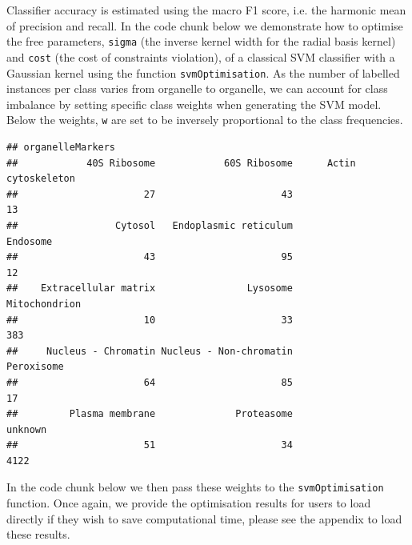 Classifier accuracy is estimated using the macro F1 score, i.e. the
harmonic mean of precision and recall. In the code chunk below we
demonstrate how to optimise the free parameters, \texttt{sigma} (the
inverse kernel width for the radial basis kernel) and \texttt{cost}
(the cost of constraints violation), of a classical SVM classifier
with a Gaussian kernel using the function \texttt{svmOptimisation}. As
the number of labelled instances per class varies from organelle to
organelle, we can account for class imbalance by setting specific
class weights when generating the SVM model. Below the weights,
\texttt{w} are set to be inversely proportional to the class
frequencies.

\begin{knitrout}
\color{fgcolor}\begin{kframe}
\begin{alltt}
 \hlkwb{<-} \hlstd{(}  \hlstd{=} \hlstd{))}
\end{alltt}
\begin{verbatim}
## organelleMarkers
##            40S Ribosome            60S Ribosome      Actin cytoskeleton 
##                      27                      43                      13 
##                 Cytosol   Endoplasmic reticulum                Endosome 
##                      43                      95                      12 
##    Extracellular matrix                Lysosome           Mitochondrion 
##                      10                      33                     383 
##     Nucleus - Chromatin Nucleus - Non-chromatin              Peroxisome 
##                      64                      85                      17 
##         Plasma membrane              Proteasome                 unknown 
##                      51                      34                    4122
\end{verbatim}
\begin{alltt}
 \hlkwb{<-} \hlopt{/}\hlstd{w[} \hlopt{!=} \hlstd{]}
\end{alltt}
\end{kframe}
\end{knitrout}

In the code chunk below we then pass these weights 
to the \texttt{svmOptimisation} function. Once again, we provide
the optimisation results for users to load directly if they wish to save
computational time, please see the appendix to load these results.




